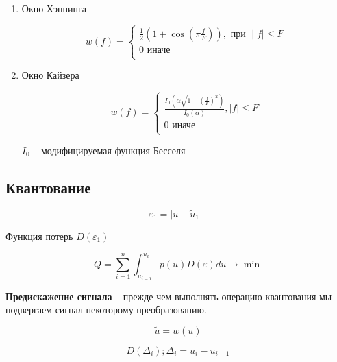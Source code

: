 \begin{enumerate}
    \item Окно Хэннинга

        \begin{equation*}
            w(f) =
            \begin{cases}
                \frac{1}{2} (1 + \cos(\pi \frac{f}{F})), \text{ при } \mid f \mid \le F \\
                0 \text{ иначе} \\
            \end{cases}
        \end{equation*}

    \item Окно Кайзера

        \begin{equation*}
            w(f) =
            \begin{cases}
                \frac{I_0 (\alpha \sqrt{1 - (\frac{f}{F})^2})}{I_0(\alpha)}, \mid f \mid \le F \\
                0 \text{ иначе} \\
            \end{cases}
        \end{equation*}

        $I_0$ -- модифицируемая функция Бесселя
\end{enumerate}

\subsection{Квантование}

\begin{equation*}
    \varepsilon_1 = \mid u - \tilde u_1 \mid
\end{equation*}

Функция потерь $D(\varepsilon_1)$

\begin{equation*}
    Q = \sum_{i=1}^{n} \int_{u_{i-1}}^{u_i} p(u)D(\varepsilon) du \rightarrow \min
\end{equation*}

\textbf{Предискажение сигнала} -- прежде чем выполнять операцию квантования мы подвергаем сигнал некоторому преобразованию.

\begin{equation*}
    \tilde u = w(u)
\end{equation*}

\begin{equation*}
    D(\Delta_i); \Delta_i = u_i - u_{i-1}
\end{equation*}


